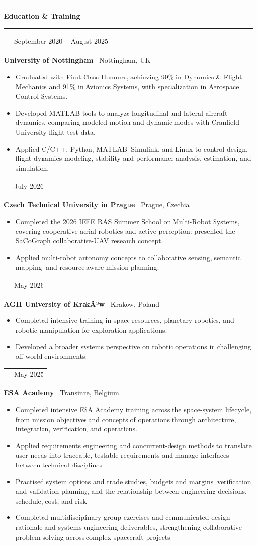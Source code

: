 \documentclass[10pt,a4paper]{article}
\makeatletter
\newcommand{\SectionSize}{11.5pt}
\newcommand{\RoleSize}{10.3pt}
\newcommand{\CompanySize}{9.6pt}
\newcommand{\DurationSize}{9pt}
\newcommand{\BodySize}{9.2pt}
\newcommand{\SectionLineSize}{12pt}
\newcommand{\RoleLineSize}{11.5pt}
\newcommand{\CompanyLineSize}{10.8pt}
\newcommand{\DurationLineSize}{9pt}
\newcommand{\BodyLineSize}{11pt}
\newcommand{\SectionBefore}{4pt}
\newcommand{\SectionLineToTitle}{0pt}
\newcommand{\SectionTitleToLine}{2pt}
\newcommand{\SectionLineToEntry}{0pt}
\newcommand{\EntryBefore}{0pt}
\newcommand{\RoleToCompany}{-5pt}
\newcommand{\CompanyToBullets}{3pt}
\newcommand{\EntryAfter}{6pt}
\newcommand{\BulletSpacing}{2pt}
\newcommand{\BulletBefore}{0pt}
\newcommand{\BulletIndent}{1.25em}
\newcommand{\SectionLineThickness}{1.5pt}
\newcommand{\SubsectionLineThickness}{0.4pt}
\newcommand{\DurationWidth}{4.5cm}
\newcommand{\CVSection}[1]{

    \vspace{\SectionBefore}


    \noindent
    \textcolor{CVBlack}{
        \rule{\textwidth}{\SectionLineThickness}
    }

    \vspace{\SectionLineToTitle}


    {\fontsize{\SectionSize}{\SectionLineSize}
    \selectfont
    \textbf{\textcolor{CVBlack}{#1}}}

    \vspace{\SectionTitleToLine}


    \noindent
    \textcolor{CVLightGray}{
        \rule{\textwidth}{\SubsectionLineThickness}
    }

    \vspace{\SectionLineToEntry}
}
\newcommand{\CVEntry}[5]{

    \vspace{\EntryBefore}


    \noindent
    \begin{tabularx}{\textwidth}{
        @{}
        >{\raggedright\arraybackslash}X
        >{\raggedleft\arraybackslash}p{\DurationWidth}
        @{}
    }

        {\fontsize{\RoleSize}{\RoleLineSize}
        \selectfont
        \textbf{\textcolor{CVBlack}{#1}}}
        &
        {\fontsize{\DurationSize}{\DurationLineSize}
        \selectfont
        \textcolor{CVGray}{#4}}

    \end{tabularx}

    \vspace{\RoleToCompany}


    \noindent
    {\fontsize{\CompanySize}{\CompanyLineSize}
    \selectfont
    \textbf{\textcolor{CVDarkGray}{#2}}
    \textcolor{CVGray}{\textbar\ #3}}

    \vspace{\CompanyToBullets}


    \begin{itemize}[
        leftmargin=\BulletIndent,
        itemsep=\BulletSpacing,
        topsep=\BulletBefore,
        parsep=0pt,
        partopsep=0pt
    ]
        #5
    \end{itemize}

    \vspace{\EntryAfter}
}
\newcommand{\CVBullet}[1]{
    \item
    {\fontsize{\BodySize}{\BodyLineSize}
    \selectfont
    \textcolor{CVDarkGray}{#1}}
}
\makeatother
\begin{document}
\CVSection{Education \& Training}

\CVEntry
{MEng Aerospace Engineering -- First-Class Honours}
{University of Nottingham}
{Nottingham, UK}
{September 2020 -- August 2025}
{
    \CVBullet{Graduated with First-Class Honours, achieving 99\% in Dynamics \& Flight Mechanics and 91\% in Avionics Systems, with specialization in Aerospace Control Systems.}

    \CVBullet{Developed MATLAB tools to analyze longitudinal and lateral aircraft dynamics, comparing modeled motion and dynamic modes with Cranfield University flight-test data.}

    \CVBullet{Applied C/C++, Python, MATLAB, Simulink, and Linux to control design, flight-dynamics modeling, stability and performance analysis, estimation, and simulation.}
}

\CVEntry
{IEEE RAS Summer School on Multi-Robot Systems}
{Czech Technical University in Prague}
{Prague, Czechia}
{July 2026}
{
    \CVBullet{Completed the 2026 IEEE RAS Summer School on Multi-Robot Systems, covering cooperative aerial robotics and active perception; presented the SaCoGraph collaborative-UAV research concept.}

    \CVBullet{Applied multi-robot autonomy concepts to collaborative sensing, semantic mapping, and resource-aware mission planning.}
}

\CVEntry
{Space Resources \& Robotics Summer School}
{AGH University of KrakÃ³w}
{Krakow, Poland}
{May 2026}
{
    \CVBullet{Completed intensive training in space resources, planetary robotics, and robotic manipulation for exploration applications.}

    \CVBullet{Developed a broader systems perspective on robotic operations in challenging off-world environments.}
}

\CVEntry
{Space Systems Engineering Training Course}
{ESA Academy}
{Transinne, Belgium}
{May 2025}
{
    \CVBullet{Completed intensive ESA Academy training across the space-system lifecycle, from mission objectives and concepts of operations through architecture, integration, verification, and operations.}

    \CVBullet{Applied requirements engineering and concurrent-design methods to translate user needs into traceable, testable requirements and manage interfaces between technical disciplines.}

    \CVBullet{Practised system options and trade studies, budgets and margins, verification and validation planning, and the relationship between engineering decisions, schedule, cost, and risk.}

    \CVBullet{Completed multidisciplinary group exercises and communicated design rationale and systems-engineering deliverables, strengthening collaborative problem-solving across complex spacecraft projects.}
}
\end{document}
